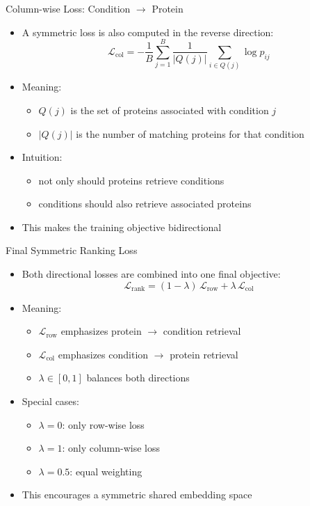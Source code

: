 \begin{frame}{Column-wise Loss: Condition \texorpdfstring{$\rightarrow$}{->} Protein}    
    \begin{itemize}
        \item A symmetric loss is also computed in the reverse direction:
        \[
            \mathcal{L}_{\text{col}} =
            - \frac{1}{B} \sum_{j=1}^{B}
            \frac{1}{|Q(j)|}
            \sum_{i \in Q(j)} \log p_{ij}
        \]
        \item Meaning:
        \begin{itemize}
            \item $Q(j)$ is the set of proteins associated with condition $j$
            \item $|Q(j)|$ is the number of matching proteins for that condition
        \end{itemize}
        \item Intuition:
        \begin{itemize}
            \item not only should proteins retrieve conditions
            \item conditions should also retrieve associated proteins
        \end{itemize}
        \item This makes the training objective bidirectional
    \end{itemize}
    \label{frame:column_wise_loss}
\end{frame}

\begin{frame}{Final Symmetric Ranking Loss}    
    \begin{itemize}
        \item Both directional losses are combined into one final objective:
        \[
            \mathcal{L}_{\text{rank}} =
            (1 - \lambda)\,\mathcal{L}_{\text{row}} +
            \lambda\,\mathcal{L}_{\text{col}}
        \]
        \item Meaning:
        \begin{itemize}
            \item $\mathcal{L}_{\text{row}}$ emphasizes protein $\rightarrow$ condition retrieval
            \item $\mathcal{L}_{\text{col}}$ emphasizes condition $\rightarrow$ protein retrieval
            \item $\lambda \in [0,1]$ balances both directions
        \end{itemize}
        \item Special cases:
        \begin{itemize}
            \item $\lambda = 0$: only row-wise loss
            \item $\lambda = 1$: only column-wise loss
            \item $\lambda = 0.5$: equal weighting
        \end{itemize}
        \item This encourages a symmetric shared embedding space
    \end{itemize}
    \label{frame:final_symmetric_ranking_loss}
\end{frame}
